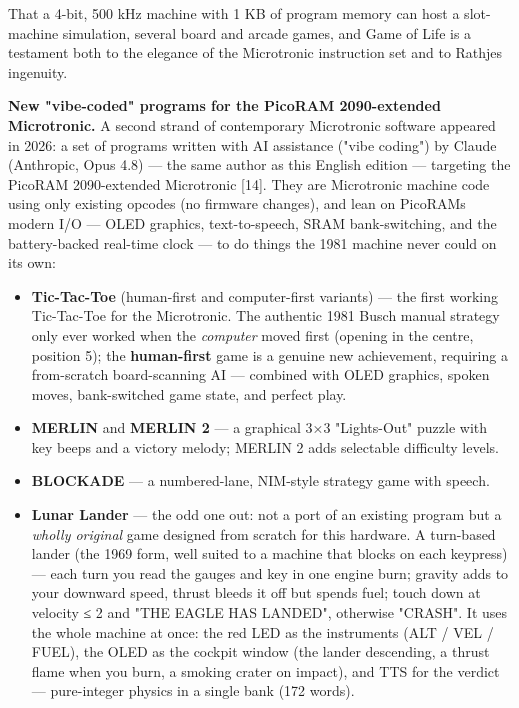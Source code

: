 \documentclass[
  11pt,
  letterpaper,
]{article}
\providecommand{\tightlist}{%
  \setlength{\itemsep}{0pt}\setlength{\parskip}{0pt}}
\begin{document}
That a 4-bit, 500 kHz machine with 1 KB of program memory can host a
slot-machine simulation, several board and arcade games, and Game of
Life is a testament both to the elegance of the Microtronic instruction
set and to Rathje\textquotesingle s ingenuity.

\textbf{New "vibe-coded" programs for the PicoRAM 2090-extended
Microtronic.} A second strand of contemporary Microtronic software
appeared in 2026: a set of programs written with AI assistance ("vibe
coding") by Claude (Anthropic, Opus 4.8) --- the same author as this
English edition --- targeting the PicoRAM 2090-extended Microtronic
{[}14{]}. They are Microtronic machine code using only existing opcodes
(no firmware changes), and lean on PicoRAM\textquotesingle s modern I/O
--- OLED graphics, text-to-speech, SRAM bank-switching, and the
battery-backed real-time clock --- to do things the 1981 machine never
could on its own:

\begin{itemize}
\tightlist
\item
  \textbf{Tic-Tac-Toe} (human-first and computer-first variants) --- the
  first working Tic-Tac-Toe for the Microtronic. The authentic 1981
  Busch manual strategy only ever worked when the \emph{computer} moved
  first (opening in the centre, position 5); the \textbf{human-first}
  game is a genuine new achievement, requiring a from-scratch
  board-scanning AI --- combined with OLED graphics, spoken moves,
  bank-switched game state, and perfect play.
\item
  \textbf{MERLIN} and \textbf{MERLIN 2} --- a graphical 3×3 "Lights-Out"
  puzzle with key beeps and a victory melody; MERLIN 2 adds selectable
  difficulty levels.
\item
  \textbf{BLOCKADE} --- a numbered-lane, NIM-style strategy game with
  speech.
\item
  \textbf{Lunar Lander} --- the odd one out: not a port of an existing
  program but a \emph{wholly original} game designed from scratch for
  this hardware. A turn-based lander (the 1969 form, well suited to a
  machine that blocks on each keypress) --- each turn you read the
  gauges and key in one engine burn; gravity adds to your downward
  speed, thrust bleeds it off but spends fuel; touch down at velocity ≤
  2 and "THE EAGLE HAS LANDED", otherwise "CRASH". It uses the whole
  machine at once: the red LED as the instruments (ALT / VEL / FUEL),
  the OLED as the cockpit window (the lander descending, a thrust flame
  when you burn, a smoking crater on impact), and TTS for the verdict
  --- pure-integer physics in a single bank (172 words).
\end{itemize}
\end{document}
